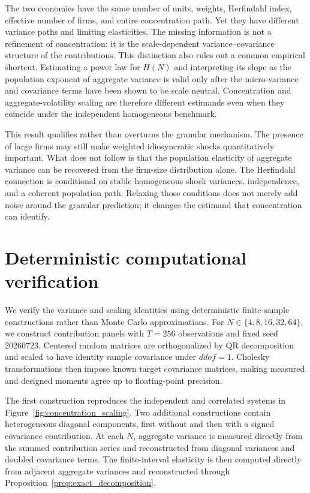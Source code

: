 \documentclass[a4paper,fleqn]{cas-dc}
\begin{document}
The two economies have the same number of units, weights, Herfindahl
index, effective number of firms, and entire concentration path. Yet they
have different variance paths and limiting elasticities. The missing
information is not a refinement of concentration: it is the
scale-dependent variance--covariance structure of the contributions.
This distinction also rules out a common empirical shortcut. Estimating a
power law for $H(N)$ and interpreting its slope as the population exponent
of aggregate variance is valid only after the micro-variance and
covariance terms have been shown to be scale neutral. Concentration and
aggregate-volatility scaling are therefore different estimands even when
they coincide under the independent homogeneous benchmark.

This result qualifies rather than overturns the granular mechanism. The
presence of large firms may still make weighted idiosyncratic shocks
quantitatively important. What does not follow is that the population
elasticity of aggregate variance can be recovered from the firm-size
distribution alone. The Herfindahl connection is conditional on stable
homogeneous shock variances, independence, and a coherent population
path. Relaxing those conditions does not merely add noise around the
granular prediction; it changes the estimand that concentration can
identify.

\section{Deterministic computational verification}
\label{sec:computational_verification}

We verify the variance and scaling identities using deterministic
finite-sample constructions rather than Monte Carlo approximations. For
$N\in\{4,8,16,32,64\}$, we construct contribution panels with $T=256$
observations and fixed seed $20260723$. Centered random matrices are
orthogonalized by QR decomposition and scaled to have identity sample
covariance under $ddof=1$. Cholesky transformations then impose known
target covariance matrices, making measured and designed moments agree
up to floating-point precision.

The first construction reproduces the independent and correlated
systems in Figure~\ref{fig:concentration_scaling}. Two additional
constructions contain heterogeneous diagonal components, first without
and then with a signed covariance contribution. At each $N$, aggregate
variance is measured directly from the summed contribution series and
reconstructed from diagonal variances and doubled covariance terms. The
finite-interval elasticity is then computed directly from adjacent
aggregate variances and reconstructed through
Proposition~\ref{prop:exact_decomposition}.
\end{document}
